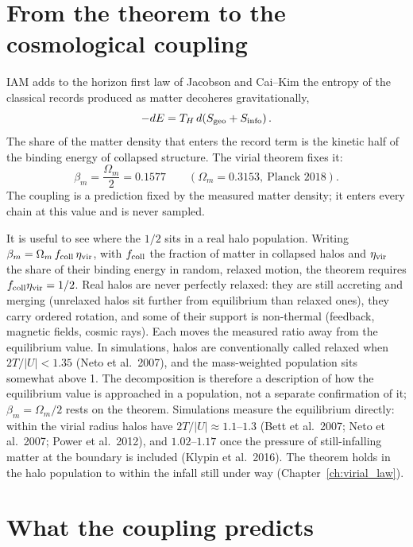 \section{From the theorem to the cosmological coupling}
IAM adds to the horizon first law of Jacobson and Cai--Kim the entropy of the classical records produced as matter decoheres gravitationally,
\begin{equation}
-dE=T_H\,d\!\left(S_{\rm geo}+S_{\rm info}\right).
\end{equation}
The share of the matter density that enters the record term is the kinetic half of the binding energy of collapsed structure. The virial theorem fixes it:
\begin{equation}
\beta_m=\frac{\Omega_m}{2}=0.1577\qquad(\Omega_m=0.3153,\ \text{Planck 2018}).
\end{equation}
The coupling is a prediction fixed by the measured matter density; it enters every chain at this value and is never sampled.

It is useful to see where the $1/2$ sits in a real halo population. Writing $\beta_m=\Omega_m\,f_{\rm coll}\,\eta_{\rm vir}$, with $f_{\rm coll}$ the
fraction of matter in collapsed halos and $\eta_{\rm vir}$ the share of their binding energy in random, relaxed motion, the theorem requires
$f_{\rm coll}\eta_{\rm vir}=1/2$. Real halos are never perfectly relaxed: they are still accreting and merging (unrelaxed halos sit further from
equilibrium than relaxed ones), they carry ordered rotation, and some of their support is non-thermal (feedback, magnetic fields, cosmic rays). Each moves the
measured ratio away from the equilibrium value. In simulations, halos are conventionally called relaxed when $2T/|U|<1.35$ (Neto et al.\ 2007), and the
mass-weighted population sits somewhat above 1. The decomposition is therefore a description of how the equilibrium value is approached in a population,
not a separate confirmation of it; $\beta_m=\Omega_m/2$ rests on the theorem.
Simulations measure the equilibrium directly: within the virial radius halos have $2T/|U|\approx1.1$--$1.3$ (Bett et al.\ 2007; Neto et al.\ 2007;
Power et al.\ 2012), and $1.02$--$1.17$ once the pressure of still-infalling matter at the boundary is included (Klypin et al.\ 2016). The theorem holds in
the halo population to within the infall still under way (Chapter~\ref{ch:virial_law}).

\section{What the coupling predicts}
